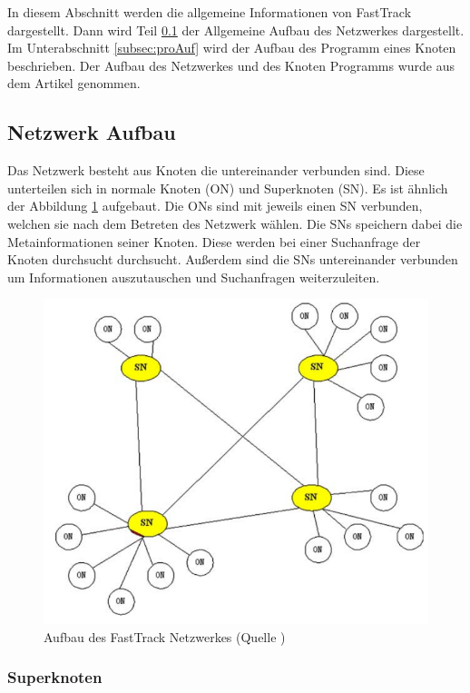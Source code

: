 In diesem Abschnitt werden die allgemeine Informationen von FastTrack dargestellt.
Dann wird Teil \ref{subsec:netAuf} der Allgemeine Aufbau des Netzwerkes dargestellt. 
Im Unterabschnitt \ref{subsec:proAuf} wird der Aufbau des Programm eines Knoten beschrieben.
Der Aufbau des Netzwerkes und des Knoten Programms wurde aus dem Artikel \cite{liang2006fasttrack} genommen.

\subsection{Netzwerk Aufbau}
\label{subsec:netAuf}

Das Netzwerk besteht aus Knoten die untereinander verbunden sind.
Diese unterteilen sich in normale Knoten (ON) und Superknoten (SN).
Es ist ähnlich der Abbildung \ref{fig:auf} aufgebaut.
Die ONs sind mit jeweils einen SN verbunden, welchen sie nach dem Betreten des Netzwerk wählen.
Die SNs speichern dabei die Metainformationen seiner Knoten.
Diese werden bei einer Suchanfrage der Knoten durchsucht durchsucht.
Außerdem sind die SNs untereinander verbunden um Informationen auszutauschen und Suchanfragen weiterzuleiten.

\begin{figure}
\includegraphics[scale=0.3]{gfx/aufbau}
\caption{Aufbau des FastTrack Netzwerkes (Quelle \cite{liang2006fasttrack})}
\label{fig:auf}
\end{figure}

\subsubsection{Superknoten}

